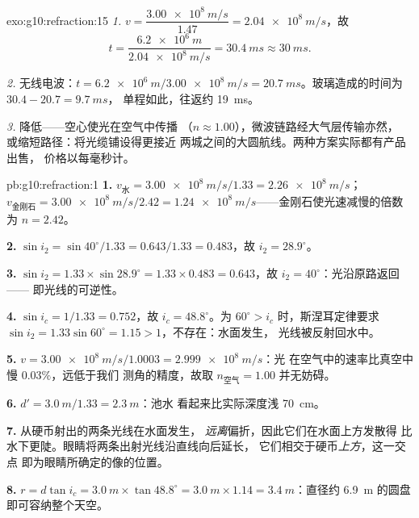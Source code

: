 \begin{solution}{exo:g10:refraction:15}
\emph{1.} $v = \dfrac{\qty{3.00e8}{m/s}}{1.47} = \qty{2.04e8}{m/s}$，故
\[
t = \frac{\qty{6.2e6}{m}}{\qty{2.04e8}{m/s}} = \qty{30.4}{ms} \approx
\qty{30}{ms}.
\]

\emph{2.} 无线电波：$t = \qty{6.2e6}{m}/\qty{3.00e8}{m/s} =
\qty{20.7}{ms}$。玻璃造成的时间为 $30.4 - 20.7 = \qty{9.7}{ms}$，
单程如此，往返约 \qty{19}{ms}。

\emph{3.} 降低——空心使光在空气中传播
（$n \approx 1.00$），微波链路经大气层传输亦然，
或缩短路径：将光缆铺设得更接近
两城之间的大圆航线。两种方案实际都有产品出售，
价格以每毫秒计。
\end{solution}

\begin{solution}{pb:g10:refraction:1}
\textbf{1.} $v_{\text{水}} = \qty{3.00e8}{m/s}/1.33 =
\qty{2.26e8}{m/s}$；$v_{\text{金刚石}} = \qty{3.00e8}{m/s}/2.42 =
\qty{1.24e8}{m/s}$——金刚石使光速减慢的倍数为 $n = 2.42$。

\textbf{2.} $\sin i_2 = \sin 40^\circ / 1.33 = 0.643/1.33 = 0.483$，故
$i_2 = 28.9^\circ$。

\textbf{3.} $\sin i_2 = 1.33 \times \sin 28.9^\circ = 1.33 \times
0.483 = 0.643$，故 $i_2 = 40^\circ$：光沿原路返回——
即光线的可逆性。

\textbf{4.} $\sin i_c = 1/1.33 = 0.752$，故 $i_c = 48.8^\circ$。为
$60^\circ > i_c$ 时，斯涅耳定律要求 $\sin i_2 = 1.33 \sin
60^\circ = 1.15 > 1$，不存在：水面发生，
光线被反射回水中。

\textbf{5.} $v = \qty{3.00e8}{m/s}/1.0003 = \qty{2.999e8}{m/s}$：光
在空气中的速率比真空中慢 $0.03\%$，远低于我们
测角的精度，故取 $n_{\text{空气}} = 1.00$ 并无妨碍。

\textbf{6.} $d' = \qty{3.0}{m}/1.33 = \qty{2.3}{m}$：池水
看起来比实际深度浅 \qty{70}{cm}。

\textbf{7.} 从硬币射出的两条光线在水面发生，
\emph{远离}偏折，因此它们在水面上方发散得
比水下更陡。眼睛将两条出射光线沿直线向后延长，
它们相交于硬币\emph{上方}，这一交点
即为眼睛所确定的像的位置。

\textbf{8.} $r = d \tan i_c = \qty{3.0}{m} \times \tan 48.8^\circ =
\qty{3.0}{m} \times 1.14 = \qty{3.4}{m}$：直径约 \qty{6.9}{m}
的圆盘即可容纳整个天空。


\end{solution}
